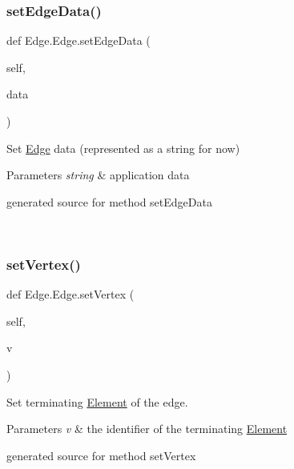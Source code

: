 \subsubsection{\texorpdfstring{set\+Edge\+Data()}{setEdgeData()}}
{\footnotesize\ttfamily def Edge.\+Edge.\+set\+Edge\+Data (\begin{DoxyParamCaption}\item[{}]{self,  }\item[{}]{data }\end{DoxyParamCaption})}



Set \hyperlink{class_edge_1_1_edge}{Edge} data (represented as a string for now) 


\begin{DoxyParams}{Parameters}
{\em string} & application data\begin{DoxyVerb}generated source for method setEdgeData \end{DoxyVerb}
 \\
\hline
\end{DoxyParams}
\hypertarget{class_edge_1_1_edge_acc0e90e6ab08122159f5130768e8cb6b}{}\label{class_edge_1_1_edge_acc0e90e6ab08122159f5130768e8cb6b} 
\subsubsection{\texorpdfstring{set\+Vertex()}{setVertex()}}
{\footnotesize\ttfamily def Edge.\+Edge.\+set\+Vertex (\begin{DoxyParamCaption}\item[{}]{self,  }\item[{}]{v }\end{DoxyParamCaption})}



Set terminating \hyperlink{namespace_element}{Element} of the edge. 


\begin{DoxyParams}{Parameters}
{\em v} & the identifier of the terminating \hyperlink{namespace_element}{Element}\begin{DoxyVerb}generated source for method setVertex \end{DoxyVerb}
 \\
\hline
\end{DoxyParams}
\hypertarget{class_edge_1_1_edge_a4989022829dad911692cbfa1a32809b0}{}\label{class_edge_1_1_edge_a4989022829dad911692cbfa1a32809b0} 
